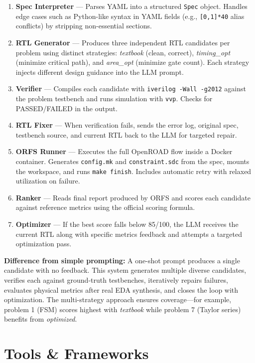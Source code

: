 \documentclass[10pt]{article}
\begin{document}
\begin{enumerate}[leftmargin=*,topsep=2pt,itemsep=1pt]
  \item \textbf{Spec Interpreter} --- Parses YAML into a structured \texttt{Spec} object. 
    Handles edge cases such as Python-like syntax in YAML fields (e.g., \texttt{[0,1]*40} alias conflicts) 
    by stripping non-essential sections.
  \item \textbf{RTL Generator} --- Produces three independent RTL candidates per problem using distinct strategies: 
    \emph{textbook} (clean, correct), \emph{timing\_opt} (minimize critical path), and \emph{area\_opt} (minimize gate count). 
    Each strategy injects different design guidance into the LLM prompt.
  \item \textbf{Verifier} --- Compiles each candidate with \texttt{iverilog -Wall -g2012} against the problem testbench 
    and runs simulation with \texttt{vvp}. Checks for PASSED/FAILED in the output.
  \item \textbf{RTL Fixer} --- When verification fails, sends the error log, original spec, testbench source, 
    and current RTL back to the LLM for targeted repair. 
  \item \textbf{ORFS Runner} --- Executes the full OpenROAD flow inside a Docker container. Generates \texttt{config.mk} 
    and \texttt{constraint.sdc} from the spec, mounts the workspace, and runs \texttt{make finish}. 
    Includes automatic retry with relaxed utilization on failure.
  \item \textbf{Ranker} --- Reads final report produced by ORFS and scores each candidate against reference metrics 
    using the official scoring formula.
  \item \textbf{Optimizer} --- If the best score falls below 85/100, the LLM receives the current RTL along with 
    specific metrics feedback and attempts a targeted optimization pass.
\end{enumerate}

\textbf{Difference from simple prompting:} A one-shot prompt produces a single candidate with no feedback. 
This system generates multiple diverse candidates, verifies each against ground-truth testbenches, 
iteratively repairs failures, evaluates physical metrics after real EDA synthesis, and closes the loop with optimization. 
The multi-strategy approach ensures coverage---for example, problem 1 (FSM) scores highest with \emph{textbook} while 
problem 7 (Taylor series) benefits from \emph{optimized}.

\section{Tools \& Frameworks}
\end{document}

